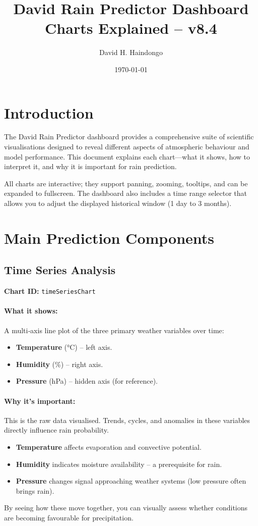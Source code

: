 \documentclass[11pt,a4paper]{article}
\title{\textbf{David Rain Predictor Dashboard \\[0.5em] \large Charts Explained – v8.4}}
\author{David H. Haindongo}
\date{\today}
\begin{document}
	
	\maketitle
	\newpage
	\tableofcontents
	\newpage
	
	\section{Introduction}
	The David Rain Predictor dashboard provides a comprehensive suite of scientific visualisations designed to reveal different aspects of atmospheric behaviour and model performance. This document explains each chart—what it shows, how to interpret it, and why it is important for rain prediction.
	
	All charts are interactive; they support panning, zooming, tooltips, and can be expanded to fullscreen. The dashboard also includes a time range selector that allows you to adjust the displayed historical window (1 day to 3 months).
	
	\section{Main Prediction Components}
	
	\subsection{Time Series Analysis}
	\textbf{Chart ID:} \texttt{timeSeriesChart}
	
	\paragraph{What it shows:}
	A multi‑axis line plot of the three primary weather variables over time:
	\begin{itemize}
		\item \textbf{Temperature} (°C) – left axis.
		\item \textbf{Humidity} (\%) – right axis.
		\item \textbf{Pressure} (hPa) – hidden axis (for reference).
	\end{itemize}
	
	\paragraph{Why it’s important:}
	This is the raw data visualised. Trends, cycles, and anomalies in these variables directly influence rain probability.
	\begin{itemize}
		\item \textbf{Temperature} affects evaporation and convective potential.
		\item \textbf{Humidity} indicates moisture availability – a prerequisite for rain.
		\item \textbf{Pressure} changes signal approaching weather systems (low pressure often brings rain).
	\end{itemize}
	By seeing how these move together, you can visually assess whether conditions are becoming favourable for precipitation.
	
\end{document}
